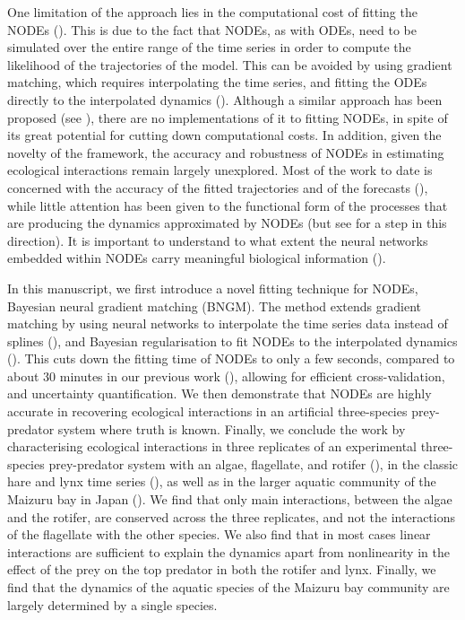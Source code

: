 \documentclass[11pt, oneside]{article}
\begin{document}
One limitation of the approach lies in the computational cost of fitting the NODEs (\cite{Chen2018,Bonnaffe2021a}).
This is due to the fact that NODEs, as with ODEs, need to be simulated over the entire range of the time series in order to compute the likelihood of the trajectories of the model.
This can be avoided by using gradient matching, which requires interpolating the time series, and fitting the ODEs directly to the interpolated dynamics (\cite{Jost2000,Aarts2001,Ellner2002}).
Although a similar approach has been proposed (see \cite{Treven2021}), there are no implementations of it to fitting NODEs, in spite of its great potential for cutting down computational costs.
In addition, given the novelty of the framework, the accuracy and robustness of NODEs in estimating ecological interactions remain largely unexplored.
Most of the work to date is concerned with the accuracy of the fitted trajectories and of the forecasts (\cite{Mai2016,Treven2021,Frank2022}), while little attention has been given to the functional form of the processes that are producing the dynamics approximated by NODEs (but see \cite{Hu2020} for a step in this direction).
It is important to understand to what extent the neural networks embedded within NODEs carry meaningful biological information (\cite{Novak2021}).

In this manuscript, we first introduce a novel fitting technique for NODEs, Bayesian neural gradient matching (BNGM). 
The method extends gradient matching by using neural networks to interpolate the time series data instead of splines (\cite{Ellner2002}), and Bayesian regularisation to fit NODEs to the interpolated dynamics (\cite{Cawley2007}). 
This cuts down the fitting time of NODEs to only a few seconds, compared to about 30 minutes in our previous work (\cite{Bonnaffe2021a}), allowing for efficient cross-validation, and uncertainty quantification.
We then demonstrate that NODEs are highly accurate in recovering ecological interactions in an artificial three-species prey-predator system where truth is known.
Finally, we conclude the work by characterising ecological interactions in three replicates of an experimental three-species prey-predator system with an algae, flagellate, and rotifer (\cite{Hiltunen2013}), in the classic hare and lynx time series (\cite{Odum1972}), as well as in the larger aquatic community of the Maizuru bay in Japan (\cite{Ushio2018}).
We find that only main interactions, between the algae and the rotifer, are conserved across the three replicates, and not the interactions of the flagellate with the other species.
We also find that in most cases linear interactions are sufficient to explain the dynamics apart from nonlinearity in the effect of the prey on the top predator in both the rotifer and lynx.
Finally, we find that the dynamics of the aquatic species of the Maizuru bay community are largely determined by a single species.
\end{document}
